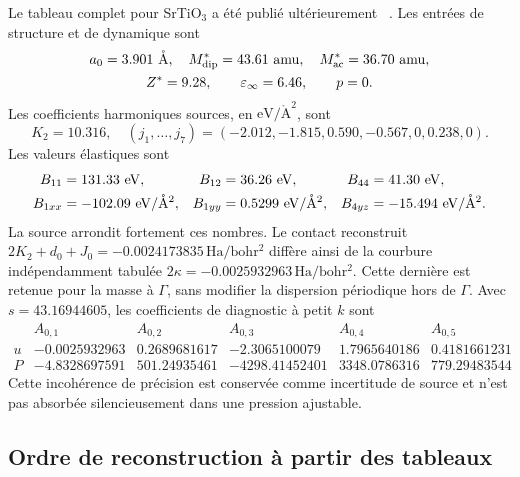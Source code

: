 Le tableau complet pour SrTiO$_3$ a été publié ultérieurement
~\cite{Nishimatsu2016}. Les entrées de structure et de dynamique sont
\begin{equation}
\begin{gathered}
a_0=3.901\ \mathring{\rm A},\quad
M^*_{\rm dip}=43.61\ {\rm amu},\quad
M^*_{\rm ac}=36.70\ {\rm amu},\\
Z^*=9.28,\qquad \varepsilon_\infty=6.46,\qquad p=0.
\end{gathered}
\label{eq:core_sto_basic_input}
\end{equation}
Les coefficients harmoniques sources, en
$\mathrm{eV/\mathring A^2}$, sont
\begin{equation}
K_2=10.316,\quad
(j_1,\ldots,j_7)=(-2.012,-1.815,0.590,-0.567,0,0.238,0).
\label{eq:core_sto_harmonic_source}
\end{equation}
Les valeurs élastiques sont
\begin{equation}
\begin{aligned}
B_{11}&=131.33\ {\rm eV},&
B_{12}&=36.26\ {\rm eV},&
B_{44}&=41.30\ {\rm eV},\\
B_{1xx}&=-102.09\ {\rm eV/\mathring A^2},&
B_{1yy}&=0.5299\ {\rm eV/\mathring A^2},&
B_{4yz}&=-15.494\ {\rm eV/\mathring A^2}.
\end{aligned}
\label{eq:core_sto_elastic_source}
\end{equation}
La source arrondit fortement ces nombres. Le contact reconstruit
$2K_2+d_0+J_0=-0.0024173835\,\mathrm{Ha/bohr^2}$ diffère ainsi de la courbure
indépendamment tabulée
$2\kappa=-0.0025932963\,\mathrm{Ha/bohr^2}$. Cette dernière est retenue pour la
masse à $\Gamma$, sans modifier la dispersion périodique hors de $\Gamma$.
Avec $s=43.16944605$, les coefficients de diagnostic à petit $k$ sont
\begingroup\small
\begin{equation}
\begin{array}{c|rrrrr}
&A_{0,1}&A_{0,2}&A_{0,3}&A_{0,4}&A_{0,5}\\ \hline
u&-0.0025932963&0.2689681617&-2.3065100079&1.7965640186&0.4181661231\\
P&-4.8328697591&501.24935461&-4298.41452401&3348.0786316&779.29483544
\end{array}
\label{eq:core_sto_final_kernel}
\end{equation}
\endgroup
Cette incohérence de précision est conservée comme incertitude de source et
n'est pas absorbée silencieusement dans une pression ajustable.

\subsection{Ordre de reconstruction à partir des tableaux}


